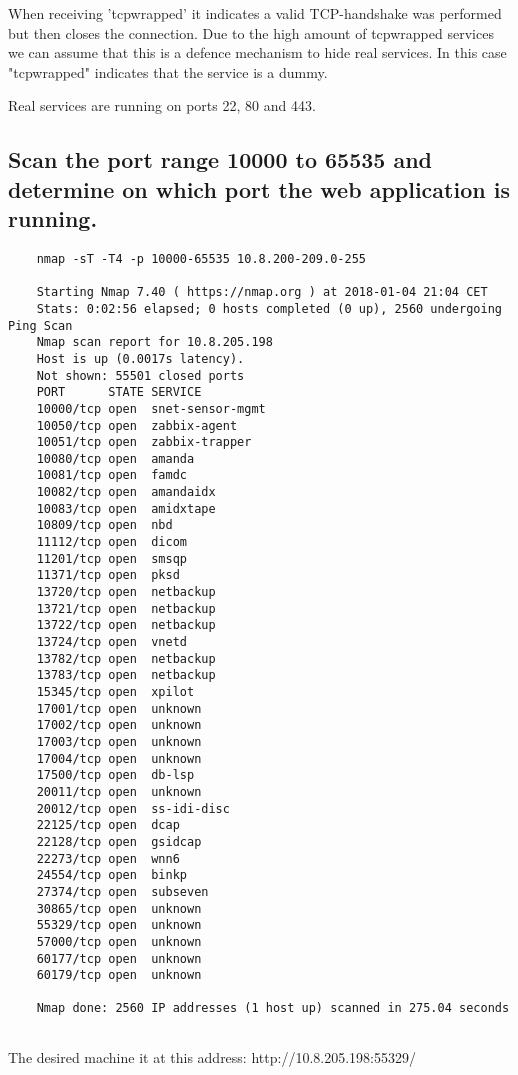When receiving 'tcpwrapped' it indicates a valid TCP-handshake was performed but then closes the connection. Due to the high amount of tcpwrapped services we can assume that this is a defence mechanism to hide real services. In this case "tcpwrapped" indicates that the service is a dummy.

Real services are running on ports 22, 80 and 443.

\subsection{Scan the port range 10000 to 65535 and determine on which port the web application is running.}

\begin{lstlisting}
	nmap -sT -T4 -p 10000-65535 10.8.200-209.0-255
	
	Starting Nmap 7.40 ( https://nmap.org ) at 2018-01-04 21:04 CET
	Stats: 0:02:56 elapsed; 0 hosts completed (0 up), 2560 undergoing Ping Scan
	Nmap scan report for 10.8.205.198
	Host is up (0.0017s latency).
	Not shown: 55501 closed ports
	PORT      STATE SERVICE
	10000/tcp open  snet-sensor-mgmt
	10050/tcp open  zabbix-agent
	10051/tcp open  zabbix-trapper
	10080/tcp open  amanda
	10081/tcp open  famdc
	10082/tcp open  amandaidx
	10083/tcp open  amidxtape
	10809/tcp open  nbd
	11112/tcp open  dicom
	11201/tcp open  smsqp
	11371/tcp open  pksd
	13720/tcp open  netbackup
	13721/tcp open  netbackup
	13722/tcp open  netbackup
	13724/tcp open  vnetd
	13782/tcp open  netbackup
	13783/tcp open  netbackup
	15345/tcp open  xpilot
	17001/tcp open  unknown
	17002/tcp open  unknown
	17003/tcp open  unknown
	17004/tcp open  unknown
	17500/tcp open  db-lsp
	20011/tcp open  unknown
	20012/tcp open  ss-idi-disc
	22125/tcp open  dcap
	22128/tcp open  gsidcap
	22273/tcp open  wnn6
	24554/tcp open  binkp
	27374/tcp open  subseven
	30865/tcp open  unknown
	55329/tcp open  unknown
	57000/tcp open  unknown
	60177/tcp open  unknown
	60179/tcp open  unknown
	
	Nmap done: 2560 IP addresses (1 host up) scanned in 275.04 seconds
	
\end{lstlisting}

The desired machine it at this address: http://10.8.205.198:55329/